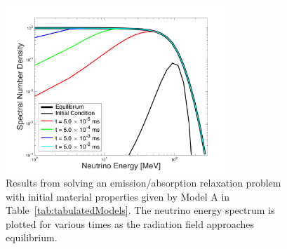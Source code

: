 \documentclass[10pt,preprint]{aastex}
\begin{document}
\begin{figure}
  \begin{center}
    \includegraphics[width=0.75\textwidth]{./Figures/RelaxationEmissionAbsorption_Spectra_ModelA}
  \end{center}
  \caption{Results from solving an emission/absorption relaxation problem with initial material properties given by Model A in Table~\ref{tab:tabulatedModels}.  
  The neutrino energy spectrum is plotted for various times as the radiation field approaches equilibrium.}
  \label{fig:RelaxationEmissionAbsorption}
\end{figure}
\end{document}
